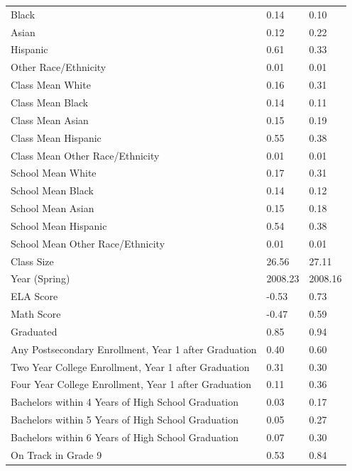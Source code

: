 \documentclass[12pt]{article}
\theoremstyle{definition}
\theoremstyle{definition}
\theoremstyle{definition}
\theoremstyle{definition}
\begin{document}
\begin{table}[]
\begin{tabular}{lll}
Black                                                   & 0.14    & 0.10    \\
Asian                                                   & 0.12    & 0.22    \\
Hispanic                                                & 0.61    & 0.33    \\
Other Race/Ethnicity                                    & 0.01    & 0.01    \\
Class Mean White                                        & 0.16    & 0.31    \\
Class Mean Black                                        & 0.14    & 0.11    \\
Class Mean Asian                                        & 0.15    & 0.19    \\
Class Mean Hispanic                                     & 0.55    & 0.38    \\
Class Mean Other   Race/Ethnicity                       & 0.01    & 0.01    \\
School Mean White                                       & 0.17    & 0.31    \\
School Mean Black                                       & 0.14    & 0.12    \\
School Mean Asian                                       & 0.15    & 0.18    \\
School Mean Hispanic                                    & 0.54    & 0.38    \\
School Mean Other   Race/Ethnicity                      & 0.01    & 0.01    \\
Class Size                                              & 26.56   & 27.11   \\
Year (Spring)                                           & 2008.23 & 2008.16 \\
ELA Score                                               & -0.53   & 0.73    \\
Math Score                                              & -0.47   & 0.59    \\
Graduated                                               & 0.85    & 0.94    \\
Any Postsecondary Enrollment,   Year 1 after Graduation & 0.40    & 0.60    \\
Two Year College Enrollment,   Year 1 after Graduation  & 0.31    & 0.30    \\
Four Year College Enrollment,   Year 1 after Graduation & 0.11    & 0.36    \\
Bachelors within 4 Years of   High School Graduation    & 0.03    & 0.17    \\
Bachelors within 5 Years of   High School Graduation    & 0.05    & 0.27    \\
Bachelors within 6 Years of   High School Graduation    & 0.07    & 0.30    \\
On Track in Grade 9                                     & 0.53    & 0.84   
\end{tabular}
\end{table}
\end{document}

